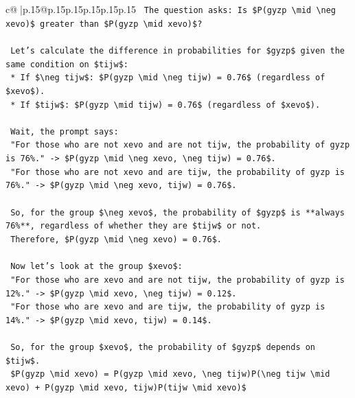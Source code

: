 \documentclass{article}
\begin{document}
{\begin{supertabular}{c@{$\;$}|p{.15\linewidth}@{}p{.15\linewidth}p{.15\linewidth}p{.15\linewidth}p{.15\linewidth}p{.15\linewidth}}
{{{\texttt{    The question asks: Is \$P(gyzp \textbackslash{}mid \textbackslash{}neg xevo)\$ greater than \$P(gyzp \textbackslash{}mid xevo)\$?} \\
\\ 
\texttt{    Let's calculate the difference in probabilities for \$gyzp\$ given the same condition on \$tijw\$:} \\
\texttt{    *   If \$\textbackslash{}neg tijw\$: \$P(gyzp \textbackslash{}mid \textbackslash{}neg tijw) = 0.76\$ (regardless of \$xevo\$).} \\
\texttt{    *   If \$tijw\$: \$P(gyzp \textbackslash{}mid tijw) = 0.76\$ (regardless of \$xevo\$).} \\
\\ 
\texttt{    Wait, the prompt says:} \\
\texttt{    "For those who are not xevo and are not tijw, the probability of gyzp is 76\%." {-}> \$P(gyzp \textbackslash{}mid \textbackslash{}neg xevo, \textbackslash{}neg tijw) = 0.76\$.} \\
\texttt{    "For those who are not xevo and are tijw, the probability of gyzp is 76\%." {-}> \$P(gyzp \textbackslash{}mid \textbackslash{}neg xevo, tijw) = 0.76\$.} \\
\\ 
\texttt{    So, for the group \$\textbackslash{}neg xevo\$, the probability of \$gyzp\$ is **always 76\%**, regardless of whether they are \$tijw\$ or not.} \\
\texttt{    Therefore, \$P(gyzp \textbackslash{}mid \textbackslash{}neg xevo) = 0.76\$.} \\
\\ 
\texttt{    Now let's look at the group \$xevo\$:} \\
\texttt{    "For those who are xevo and are not tijw, the probability of gyzp is 12\%." {-}> \$P(gyzp \textbackslash{}mid xevo, \textbackslash{}neg tijw) = 0.12\$.} \\
\texttt{    "For those who are xevo and are tijw, the probability of gyzp is 14\%." {-}> \$P(gyzp \textbackslash{}mid xevo, tijw) = 0.14\$.} \\
\\ 
\texttt{    So, for the group \$xevo\$, the probability of \$gyzp\$ depends on \$tijw\$.} \\
\texttt{    \$P(gyzp \textbackslash{}mid xevo) = P(gyzp \textbackslash{}mid xevo, \textbackslash{}neg tijw)P(\textbackslash{}neg tijw \textbackslash{}mid xevo) + P(gyzp \textbackslash{}mid xevo, tijw)P(tijw \textbackslash{}mid xevo)\$} \\
}}}
\end{supertabular}}
\end{document}
